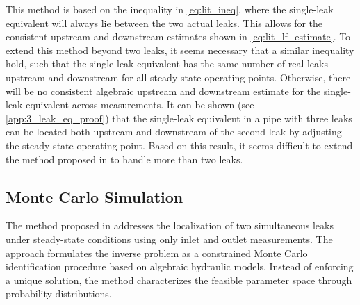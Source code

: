 This method is based on the inequality in \cref{eq:lit_ineq}, where the single-leak equivalent will always lie between the two actual leaks. This allows for the consistent upstream and downstream estimates shown in \cref{eq:lit_lf_estimate}. To extend this method beyond two leaks, it seems necessary that a similar inequality hold, such that the single-leak equivalent has the same number of real leaks upstream and downstream for all steady-state operating points. Otherwise, there will be no consistent algebraic upstream and downstream estimate for the single-leak equivalent across measurements. It can be shown (see \autoref{app:3_leak_eq_proof}) that the single-leak equivalent in a pipe with three leaks can be located both upstream and downstream of the second leak by adjusting the steady-state operating point. Based on this result, it seems difficult to extend the method proposed in \cite{peralta2023} to handle more than two leaks.  

\subsection{Monte Carlo Simulation}

The method proposed in \cite{torres2024} addresses the localization of two simultaneous leaks under steady-state conditions using only inlet and outlet measurements. The approach formulates the inverse problem as a constrained Monte Carlo identification procedure based on algebraic hydraulic models. Instead of enforcing a unique solution, the method characterizes the feasible parameter space through probability distributions.\\

